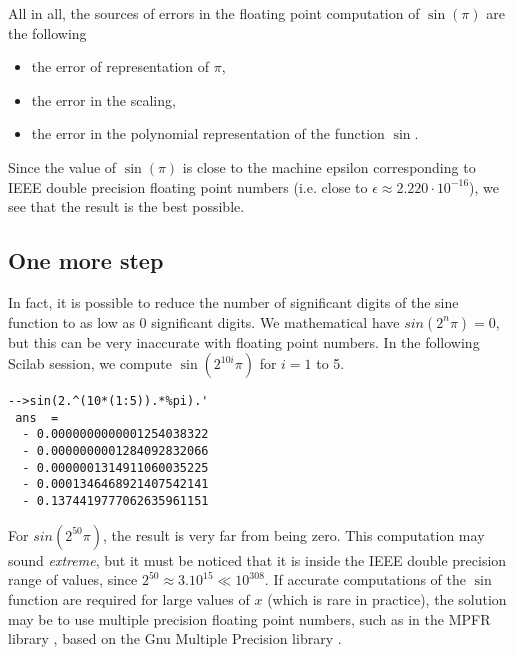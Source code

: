 All in all, the sources of errors in the floating point computation of 
$\sin(\pi)$ are the following
\begin{itemize}
\item the error of representation of $\pi$,
\item the error in the scaling,
\item the error in the polynomial representation of the function $\sin$.
\end{itemize}
Since the value of $\sin(\pi)$ is close to the machine epsilon corresponding to 
IEEE double precision floating point numbers (i.e. close to $\epsilon \approx 2.220 \cdot 10^{-16}$),
we see that the result is the best possible.

\subsection{One more step}

In fact, it is possible to reduce the number of 
significant digits of the sine function to as low as 0 significant digits.
We mathematical have $sin(2^n \pi) = 0$, but this can be very inaccurate with 
floating point numbers. In the following Scilab session, we compute $\sin(2^{10i} \pi)$
for $i=1$ to 5.
\begin{lstlisting}
-->sin(2.^(10*(1:5)).*%pi).'
 ans  =
  - 0.0000000000001254038322  
  - 0.0000000001284092832066  
  - 0.0000001314911060035225  
  - 0.0001346468921407542141  
  - 0.1374419777062635961151  
\end{lstlisting}

For $sin(2^{50}\pi)$, the result is very far from being zero. This computation
may sound \emph{extreme}, but it must be noticed that it is inside the 
IEEE double precision range of values, since $2^{50} \approx 3.10^{15} \ll 10^{308}$.
If accurate computations of the $\sin$ function are required for large values of 
$x$ (which is rare in practice), the solution may be to use multiple precision 
floating point numbers, such as in the MPFR library \cite{MPFRWeb,Fousse:2007:MMP}, based on the 
Gnu Multiple Precision library \cite{GMPWeb}. 


